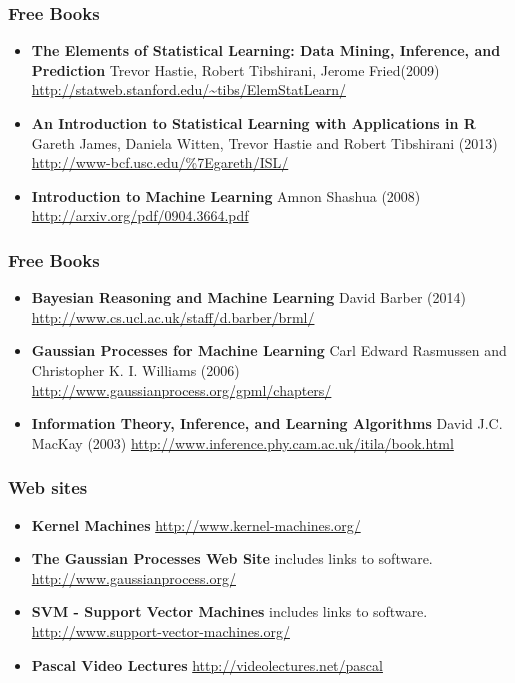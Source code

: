 \begin{frame}
\frametitle{Free Books}
\begin{itemize}
\item {\bf The Elements of Statistical Learning: Data Mining, Inference, and Prediction}
      Trevor Hastie, Robert Tibshirani, Jerome Fried(2009)
      \url{http://statweb.stanford.edu/~tibs/ElemStatLearn/}
\item {\bf An Introduction to Statistical Learning with Applications in R}
      Gareth James, Daniela Witten, Trevor Hastie and Robert Tibshirani (2013)
      \url{http://www-bcf.usc.edu/\%7Egareth/ISL/}
\item {\bf Introduction to Machine Learning}
      Amnon Shashua (2008)
      \url{http://arxiv.org/pdf/0904.3664.pdf}
\end{itemize}
\end{frame}

\begin{frame}
\frametitle{Free Books}
\begin{itemize}
\item {\bf Bayesian Reasoning and Machine Learning}
      David Barber (2014)
      \url{http://www.cs.ucl.ac.uk/staff/d.barber/brml/}
\item {\bf Gaussian Processes for Machine Learning}
      Carl Edward Rasmussen and Christopher K. I. Williams (2006)
      \url{http://www.gaussianprocess.org/gpml/chapters/}
\item {\bf Information Theory, Inference, and Learning Algorithms}
      David J.C. MacKay (2003)
      \url{http://www.inference.phy.cam.ac.uk/itila/book.html}
\end{itemize}
\end{frame}

\begin{frame}
\frametitle{Web sites}
\begin{itemize}
\item {\bf Kernel Machines} \url{http://www.kernel-machines.org/}
\item {\bf The Gaussian Processes Web Site} includes links to software. \url{http://www.gaussianprocess.org/}
\item {\bf SVM - Support Vector Machines} includes links to software. \url{http://www.support-vector-machines.org/}
\item {\bf Pascal Video Lectures}  \url{http://videolectures.net/pascal}
\end{itemize}
\end{frame}

